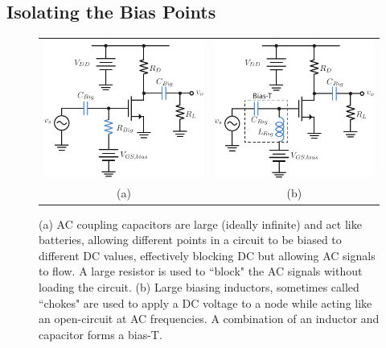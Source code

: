 \subsection{Isolating the Bias Points}
\begin{figure}[tb]
\begin{center}
\begin{tabular}{cc}
\includegraphics[width=.4\columnwidth]{csamp_bias} &
\includegraphics[width=.4\columnwidth]{csamp_biasT} \\
(a) & (b) \\
\end{tabular}
\end{center}
\caption{(a) AC coupling capacitors are large (ideally infinite) and act like batteries, allowing different points in a circuit to be biased to different DC values, effectively blocking DC but allowing AC signals to flow.  A large resistor is used to ``block" the AC signals without loading the circuit.  (b) Large biasing inductors, sometimes called ``chokes" are used to apply a DC voltage to a node while acting like an open-circuit at AC frequencies.  A combination of an inductor and capacitor forms a bias-T.}
\label{fig:ac_couple}
\end{figure}

